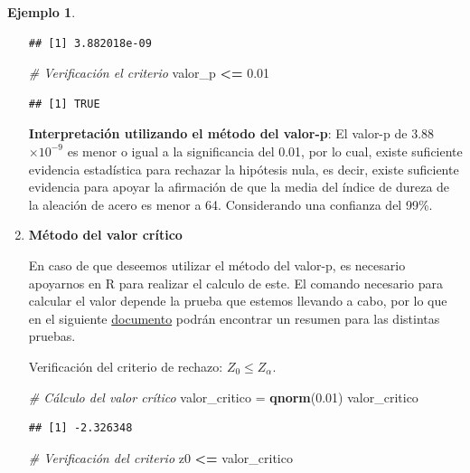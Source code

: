 \documentclass[
  11pt,
]{book}
\newenvironment{Shaded}{\begin{snugshade}}{\end{snugshade}}
\newcommand{\CommentTok}[1]{\textcolor[rgb]{0.56,0.35,0.01}{\textit{#1}}}
\newcommand{\FloatTok}[1]{\textcolor[rgb]{0.00,0.00,0.81}{#1}}
\newcommand{\FunctionTok}[1]{\textcolor[rgb]{0.13,0.29,0.53}{\textbf{#1}}}
\newcommand{\NormalTok}[1]{#1}
\newcommand{\OtherTok}[1]{\textcolor[rgb]{0.56,0.35,0.01}{#1}}
\newcommand{\SpecialCharTok}[1]{\textcolor[rgb]{0.81,0.36,0.00}{\textbf{#1}}}
\theoremstyle{definition}
\theoremstyle{definition}
\newtheorem{example}{Ejemplo}[chapter]
\theoremstyle{definition}
\theoremstyle{definition}
\theoremstyle{remark}
\begin{document}
\begin{example}
\begin{enumerate}
\begin{verbatim}
## [1] 3.882018e-09
\end{verbatim}

\begin{Shaded}
\begin{Highlighting}[]
\CommentTok{\# Verificación el criterio}
\NormalTok{valor\_p }\SpecialCharTok{\textless{}=} \FloatTok{0.01}
\end{Highlighting}
\end{Shaded}

\begin{verbatim}
## [1] TRUE
\end{verbatim}

  \textbf{Interpretación utilizando el método del valor-p}: El valor-p de 3.88 \(\times 10^{-9}\) es menor o igual a la significancia del 0.01, por lo cual, existe suficiente evidencia estadística para rechazar la hipótesis nula, es decir, existe suficiente evidencia para apoyar la afirmación de que la media del índice de dureza de la aleación de acero es menor a 64. Considerando una confianza del 99\%.
\item
  \textbf{Método del valor crítico}

  En caso de que deseemos utilizar el método del valor-p, es necesario apoyarnos en R para realizar el calculo de este. El comando necesario para calcular el valor depende la prueba que estemos llevando a cabo, por lo que en el siguiente \href{material/resumenes/Rechazo.pdf}{documento} podrán encontrar un resumen para las distintas pruebas.

  Verificación del criterio de rechazo: \(Z_0 \leq Z_{\alpha}\).

\begin{Shaded}
\begin{Highlighting}[]
\CommentTok{\# Cálculo del valor crítico}
\NormalTok{valor\_critico }\OtherTok{=} \FunctionTok{qnorm}\NormalTok{(}\FloatTok{0.01}\NormalTok{)}
\NormalTok{valor\_critico}
\end{Highlighting}
\end{Shaded}

\begin{verbatim}
## [1] -2.326348
\end{verbatim}

\begin{Shaded}
\begin{Highlighting}[]
\CommentTok{\# Verificación del criterio}
\NormalTok{z0 }\SpecialCharTok{\textless{}=}\NormalTok{ valor\_critico}
\end{Highlighting}
\end{Shaded}


\end{enumerate}
\end{example}
\end{document}
